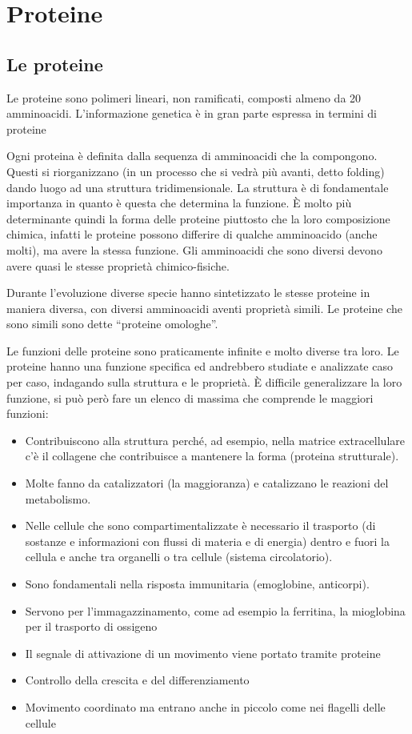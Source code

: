 \part{Proteine}


\chapter{Le proteine}


Le proteine sono polimeri lineari, non ramificati, composti almeno da 20
amminoacidi. L'informazione genetica è in gran parte espressa in termini di proteine

Ogni proteina è definita dalla sequenza di amminoacidi che la
compongono. Questi si riorganizzano (in un processo che si vedrà più
avanti, detto folding) dando luogo ad una struttura tridimensionale. La
struttura è di fondamentale importanza in quanto è questa che determina
la funzione. È molto più determinante quindi la forma delle proteine
piuttosto che la loro composizione chimica, infatti le proteine possono
differire di qualche amminoacido (anche molti), ma avere la stessa
funzione. Gli amminoacidi che sono diversi devono avere quasi le stesse
proprietà chimico-fisiche.

Durante l'evoluzione diverse specie hanno sintetizzato le stesse
proteine in maniera diversa, con diversi amminoacidi aventi proprietà
simili. Le proteine che sono simili sono dette ``proteine omologhe''.

Le funzioni delle proteine sono praticamente infinite e molto diverse
tra loro. Le proteine hanno una funzione specifica ed andrebbero
studiate e analizzate caso per caso, indagando sulla struttura e le
proprietà. È difficile generalizzare la loro funzione, si può però fare
un elenco di massima che comprende le maggiori funzioni:
\begin{itemize}
\item
Contribuiscono alla struttura perché, ad esempio, nella matrice
extracellulare c'è il collagene che contribuisce a mantenere la forma
(proteina strutturale).
\item
Molte fanno da catalizzatori (la maggioranza) e catalizzano le
reazioni del metabolismo.
\item
Nelle cellule che sono compartimentalizzate è necessario il trasporto
(di sostanze e informazioni con flussi di materia e di energia) dentro
e fuori la cellula e anche tra organelli o tra cellule (sistema
circolatorio).
\item
Sono fondamentali nella risposta immunitaria (emoglobine, anticorpi).
\item
Servono per l'immagazzinamento, come ad esempio la ferritina, la mioglobina per il trasporto di ossigeno
\item
Il segnale di attivazione di un movimento viene portato tramite
proteine
\item
Controllo della crescita e del differenziamento
\item
Movimento coordinato ma entrano anche in piccolo come nei flagelli
delle cellule
\end{itemize}

